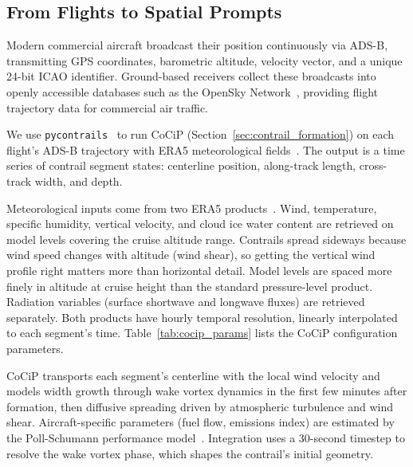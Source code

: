 \documentclass[1p,11pt]{elsarticle}
\begin{document}
\subsection{From Flights to Spatial Prompts}

Modern commercial aircraft broadcast their position continuously via ADS-B, transmitting GPS coordinates, barometric altitude, velocity vector, and a unique 24-bit ICAO identifier. Ground-based receivers collect these broadcasts into openly accessible databases such as the OpenSky Network~\cite{schafer2014opensky}, providing flight trajectory data for commercial air traffic.

We use \texttt{pycontrails}~\cite{pycontrails} to run CoCiP (Section~\ref{sec:contrail_formation}) on each flight's ADS-B trajectory with ERA5 meteorological fields~\cite{hersbach2020era5}. The output is a time series of contrail segment states: centerline position, along-track length, cross-track width, and depth.

Meteorological inputs come from two ERA5 products~\cite{hersbach2020era5}. Wind, temperature, specific humidity, vertical velocity, and cloud ice water content are retrieved on model levels covering the cruise altitude range. Contrails spread sideways because wind speed changes with altitude (wind shear), so getting the vertical wind profile right matters more than horizontal detail. Model levels are spaced more finely in altitude at cruise height than the standard pressure-level product. Radiation variables (surface shortwave and longwave fluxes) are retrieved separately. Both products have hourly temporal resolution, linearly interpolated to each segment's time. Table~\ref{tab:cocip_params} lists the CoCiP configuration parameters.

CoCiP transports each segment's centerline with the local wind velocity and models width growth through wake vortex dynamics in the first few minutes after formation, then diffusive spreading driven by atmospheric turbulence and wind shear. Aircraft-specific parameters (fuel flow, emissions index) are estimated by the Poll-Schumann performance model~\cite{poll2021estimation}. Integration uses a 30-second timestep to resolve the wake vortex phase, which shapes the contrail's initial geometry.
\end{document}
